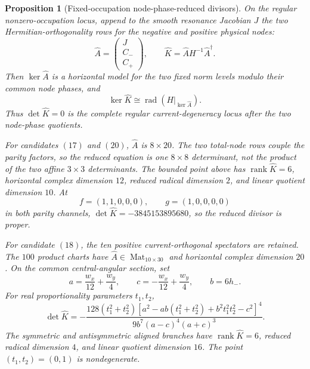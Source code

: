 \documentclass[11pt]{article}
\newtheorem{proposition}[theorem]{Proposition}
\theoremstyle{definition}
\theoremstyle{remark}
\begin{document}
\begin{proposition}[Fixed-occupation node-phase-reduced divisors]
\label{prop:phase-reduced-presymplectic-divisors}
On the regular nonzero-occupation locus, append to the smooth resonance
Jacobian \(J\) the two Hermitian-orthogonality rows for the negative and
positive physical nodes:
\[
 \widehat A=\begin{pmatrix}J\\ C_-\\ C_+\end{pmatrix},
 \qquad
 \widehat K=\widehat A H^{-1}\widehat A^\dagger .
\]
Then \(\ker\widehat A\) is a horizontal model for the two fixed norm levels
modulo their common node phases, and
\[
 \ker\widehat K
 \cong
 \operatorname{rad}\!\left(H|_{\ker\widehat A}\right).
\]
Thus \(\det\widehat K=0\) is the complete regular current-degeneracy locus
after the two node-phase quotients.

For candidates \((17)\) and \((20)\), \(\widehat A\) is \(8\times20\).
The two total-node rows couple the parity factors, so the reduced equation is
one \(8\times8\) determinant, not the product of the two affine
\(3\times3\) determinants.  The bounded point above has
\(\operatorname{rank}\widehat K=6\), horizontal complex dimension \(12\), reduced radical
dimension \(2\), and linear quotient dimension \(10\).  At
\[
 f=(1,1,0,0,0),\qquad g=(1,0,0,0,0)
\]
in both parity channels, \(\det\widehat K=-3845153895680\), so the reduced
divisor is proper.

For candidate \((18)\), the ten positive current-orthogonal spectators are
retained.  The \(100\) product charts have
\(\widehat A\in\operatorname{Mat}_{10\times30}\) and horizontal complex
dimension \(20\).  On the common central-angular section, set
\[
 a=\frac{w_x}{12}+\frac{w_y}{4},\qquad
 c=-\frac{w_x}{12}+\frac{w_y}{4},\qquad b=6h_- .
\]
For real proportionality parameters \(t_1,t_2\),
\[
 \det\widehat K=
 -\frac{128(t_1^2+t_2^2)
 \left[
 a^2-ab(t_1^2+t_2^2)+b^2t_1^2t_2^2-c^2
 \right]^4}
 {9b^7(a-c)^4(a+c)^3}.
\]
The symmetric and antisymmetric aligned branches have
\(\operatorname{rank}\widehat K=6\), reduced radical dimension \(4\), and linear quotient
dimension \(16\).  The point \((t_1,t_2)=(0,1)\) is nondegenerate.
\end{proposition}
\end{document}
